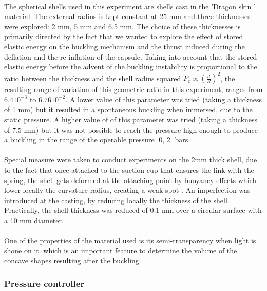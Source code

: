 \paragraph{}
The spherical shells used in this experiment are shells cast in the 'Dragon skin ' material. The external radius is kept constant at 25 mm and three thicknesses were explored: 2 mm, 5 mm and 6.5 mm.
The choice of these thicknesses is primarily directed by the fact that we wanted to explore the effect of stored elastic energy on the buckling mechanism and the thrust induced during the deflation and the re-inflation of the capsule. Taking into account that the stored elastic energy before the advent of the buckling instability is proportional to the ratio between the thickness and the shell radius squared \cite{cqpcritic2011} $P_c \propto (\frac{d}{R})^2$, the resulting range of variation of this geometric ratio in this experiment, ranges from $6.4 10^{-3}$ to $6.76 10^{-2}$.
A lower value of this parameter was tried (taking a thickness of 1 mm) but it resulted in a spontaneous buckling when immersed, due to the static pressure.
A higher value of of this parameter was tried (taking a thickness of 7.5 mm) but it was not possible to reach the pressure high enough to produce a buckling in the range of the operable pressure [0, 2] bars.
\paragraph{}
Special measure were taken to conduct experiments on the 2mm thick shell, due to the fact that once attached to the suction cup that ensures the link with the spring, the shell gets deformed at the attaching point by buoyancy effects which lower locally the curvature radius, creating a weak spot \cite{cqpcritic2011}. An imperfection was introduced at the casting, by reducing locally the thickness of the shell. Practically, the shell thickness was reduced of 0.1 mm over a circular surface with a 10 mm diameter.
\paragraph{}
One of the properties of the material used is its semi-transparency when light is shone on it. which is an important feature to determine the volume of the concave shapes resulting after the buckling.

\subsubsection{Pressure controller}
\label{sssection:pressure_controller}
